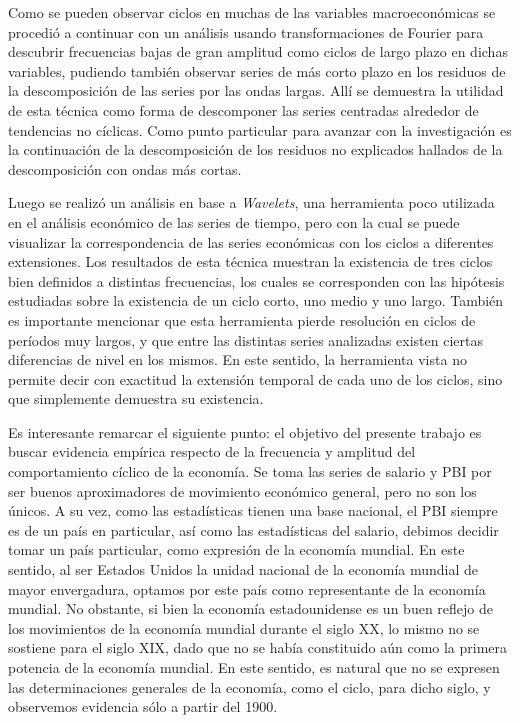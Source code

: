 \documentclass[a4paper]{article}
\begin{document}
Como se pueden observar ciclos en muchas de las variables macroeconómicas se procedió a continuar con un análisis usando transformaciones de Fourier para descubrir frecuencias bajas de gran amplitud como ciclos de largo plazo en dichas variables, pudiendo también observar series de más corto plazo en los residuos de la descomposición de las series por las ondas largas. Allí se demuestra la utilidad de esta técnica como forma de descomponer las series centradas alrededor de tendencias no cíclicas. Como punto particular para avanzar con la investigación es la continuación de la descomposición de los residuos no explicados hallados de la descomposición con ondas más cortas.

Luego se realizó un análisis en base a \textit{Wavelets}, una herramienta poco utilizada en el análisis económico de las series de tiempo, pero con la cual se puede visualizar la correspondencia de las series económicas con los ciclos a diferentes extensiones. Los resultados de esta técnica muestran la existencia de tres ciclos bien definidos a distintas frecuencias, los cuales se corresponden con las hipótesis estudiadas sobre la existencia de un ciclo corto, uno medio y uno largo. También es importante mencionar que esta herramienta pierde resolución en ciclos de períodos muy largos, y que entre las distintas series analizadas existen ciertas diferencias de nivel en los mismos. En este sentido, la herramienta vista no permite decir con exactitud la extensión temporal de cada uno de los ciclos, sino que simplemente demuestra su existencia.

Es interesante remarcar el siguiente punto: el objetivo del presente trabajo es buscar evidencia empírica respecto de la frecuencia y amplitud del comportamiento cíclico de la economía. Se toma las series de salario y PBI por ser buenos aproximadores de movimiento económico general, pero no son los únicos. A su vez, como las estadísticas tienen una base nacional, el PBI siempre es de un país en particular, así como las estadísticas del salario, debimos decidir tomar un país particular, como expresión de la economía mundial. En este sentido, al ser Estados Unidos la unidad nacional de la economía mundial de mayor envergadura, optamos por este país como representante de la economía mundial. No obstante, si bien la economía estadounidense es un buen reflejo de los movimientos de la economía mundial durante el siglo XX, lo mismo no se sostiene para el siglo XIX, dado que no se había constituido aún como la primera potencia de la economía mundial. En este sentido, es natural que no se expresen las determinaciones generales de la economía, como el ciclo, para dicho siglo, y observemos evidencia sólo a partir del 1900.
\end{document}
